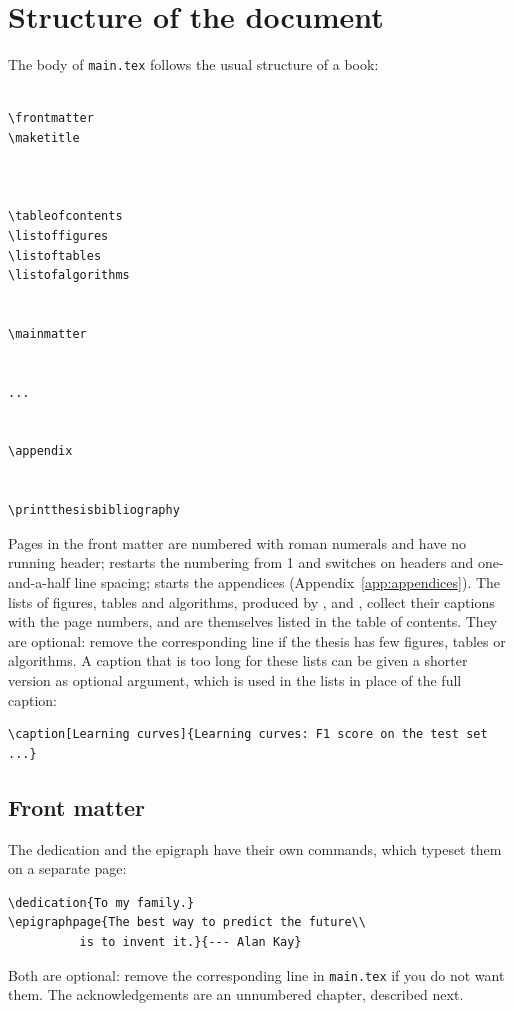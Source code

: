 \section{Structure of the document} \label{sec:structure}

The body of \texttt{main.tex} follows the usual structure of a book:
\begin{Verbatim}

\frontmatter
\maketitle



\tableofcontents
\listoffigures
\listoftables
\listofalgorithms


\mainmatter


...


\appendix


\printthesisbibliography

\end{Verbatim}
Pages in the front matter are numbered with roman numerals and have no
running header;  restarts the numbering from 1 and switches
on headers and one-and-a-half line spacing;  starts the
appendices (Appendix~\ref{app:appendices}). The lists of figures, tables
and algorithms, produced by ,  and
, collect their captions with the page numbers, and
are themselves listed in the table of contents. They are optional: remove
the corresponding line if the thesis has few figures, tables or
algorithms. A caption that
is too long for these lists can be given a shorter version as optional
argument, which is used in the lists in place of the full caption:
\begin{Verbatim}
\caption[Learning curves]{Learning curves: F1 score on the test set ...}
\end{Verbatim}

\subsection{Front matter}

The dedication and the epigraph have their own commands, which typeset them
on a separate page:
\begin{Verbatim}
\dedication{To my family.}
\epigraphpage{The best way to predict the future\\
          is to invent it.}{--- Alan Kay}
\end{Verbatim}
Both are optional: remove the corresponding  line in
\texttt{main.tex} if you do not want them. The acknowledgements are an
unnumbered chapter, described next.

